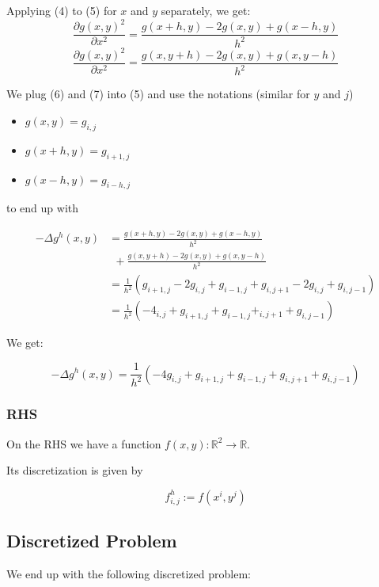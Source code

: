 \documentclass[unicode,11pt,a4paper,oneside,numbers=endperiod,openany]{scrartcl}
\begin{document}
Applying (4) to (5) for $x$ and $y$ separately, we get:
\begin{equation}
  \frac{\partial g(x, y)^2}{\partial x^2} = 
    \frac{g(x + h, y) - 2g(x, y) + g(x - h, y)}{h^2}
\end{equation}
\begin{equation}
  \frac{\partial g(x, y)^2}{\partial x^2} = 
    \frac{g(x, y + h) - 2g(x, y) + g(x, y - h)}{h^2}
\end{equation}

We plug (6) and (7) into (5) and use the notations (similar for $y$ and $j$)
\begin{itemize}
  \item $g(x, y) = g_{i,j}$
  \item $g(x + h, y) = g_{i+1, j}$
  \item $g(x - h, y) = g_{i-h, j}$
\end{itemize}

to end up with

\begin{align}
  -\Delta g^h(x,y) & = \frac{g(x + h, y) - 2g(x, y) + g(x - h, y)}{h^2} \\
                 &\ \ + \frac{g(x, y + h) - 2g(x, y) + g(x, y - h)}{h^2} \\
                 &= \frac{1}{h^2} ( g_{i+1,j} - 2g_{i,j} + g_{i-1,j}
                      + g_{i, j+1} - 2g_{i,j} + g_{i,j-1}) \\
                 &= \frac{1}{h^2} ( -4_{i,j} + g_{i+1,j} + g_{i-1,j}
                      + _{i, j+1} + g_{i,j-1} )
\end{align}

We get:

\begin{equation}
  \boxed{
      -\Delta g^h(x,y) = \frac{1}{h^2} ( -4g_{i,j} + g_{i+1,j} + g_{i-1,j}
                           + g_{i, j+1} + g_{i,j-1} )
  }
\end{equation}

\subsubsection{RHS}
On the RHS we have a function $f(x, y): \mathbb R^2 \to \mathbb R$.

Its discretization is given by 

\begin{equation}
  \boxed{
    f_{i,j}^h := f(x^i, y^j)
  }
\end{equation}

\subsection{Discretized Problem}
We end up with the following discretized problem:
\end{document}

